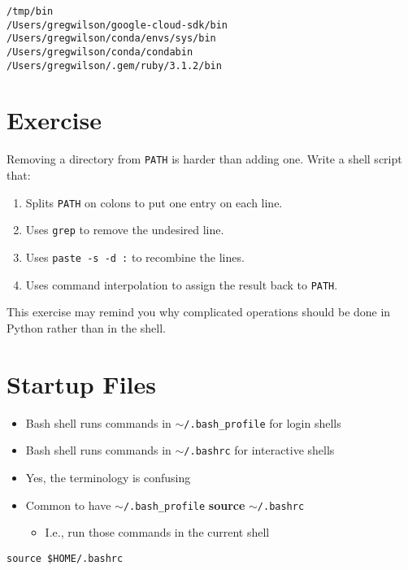 \documentclass[krantzl]{krantz}
\newcommand{\glossref}[1]{\textbf{#1}}
\begin{document}
\begin{lstlisting}[frame=tblr,backgroundcolor=\color{black!5}]
/tmp/bin
/Users/gregwilson/google-cloud-sdk/bin
/Users/gregwilson/conda/envs/sys/bin
/Users/gregwilson/conda/condabin
/Users/gregwilson/.gem/ruby/3.1.2/bin
\end{lstlisting}

\section{Exercise}

Removing a directory from \texttt{PATH} is harder than adding one.
Write a shell script that:

\begin{enumerate}
\item Splits \texttt{PATH} on colons to put one entry on each line.

\item Uses \texttt{grep} to remove the undesired line.

\item Uses \texttt{paste -s -d :} to recombine the lines.

\item Uses command interpolation to assign the result back to \texttt{PATH}.

\end{enumerate}

This exercise may remind you why
complicated operations should be done in Python rather than in the shell.

\section{Startup Files}
\begin{itemize}
\item Bash shell runs commands in \texttt{$\sim$/.bash\_profile} for login shells

\item Bash shell runs commands in \texttt{$\sim$/.bashrc} for interactive shells

\item Yes, the terminology is confusing

\item Common to have \texttt{$\sim$/.bash\_profile} \glossref{source} \texttt{$\sim$/.bashrc}\begin{itemize}
\item I.e., run those commands in the current shell

\end{itemize}


\end{itemize}
\begin{lstlisting}[frame=tblr]
source $HOME/.bashrc
\end{lstlisting}
\end{document}
